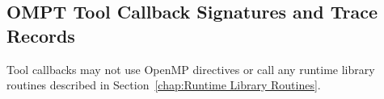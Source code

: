 %
%
%
%
%
%
%
%
%
%
%
%
%


\subsection{OMPT Tool Callback Signatures and Trace Records}
\label{sec:ompt-tool-callbacks}

\restrictions
Tool callbacks may not use OpenMP directives or call any runtime library routines
described in Section~\ref{chap:Runtime Library Routines}.

